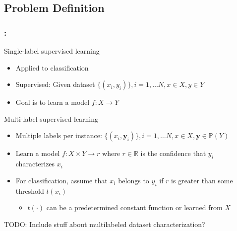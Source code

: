 \documentclass{beamer}
\begin{document}
\subsection{Problem Definition}
\begin{frame}
\frametitle{\insertsection : \insertsubsection}
Single-label supervised learning
\begin{itemize}
	\item Applied to classification
	\item Supervised: Given dataset $\{ (x_i, y_i)\}, i = 1, \dots N, x \in X, y \in Y$
	\item Goal is to learn a model $f: X \rightarrow Y$
\end{itemize}

Multi-label supervised learning
\begin{itemize}
	\item Multiple labels per instance: $\{ (x_i, \bm{y}_i)\}, i = 1, \dots N, x \in X, \bm{y} \in \mathbb{P}(Y)$
	\item Learn a model $f: X \times Y \rightarrow r$ where $r\in \mathbb{R}$ is the confidence that $y_i$ characterizes $x_i$
	\item For classification, assume that $x_i$ belongs to $y_i$ if $r$ is greater than some threshold $t(x_i)$

		\begin{itemize}
			\item $t(\cdot)$ can be a predetermined constant function or learned from $X$
		\end{itemize}

\end{itemize}
TODO: Include stuff about multilabeled dataset characterization?
\end{frame}

\end{document}
